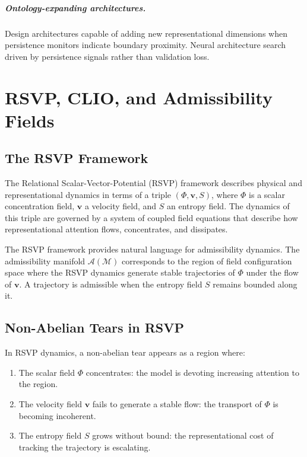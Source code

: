 \documentclass[12pt,oneside]{book}
\theoremstyle{plain}
\theoremstyle{definition}
\theoremstyle{remark}
\newcommand{\M}{\mathcal{M}}
\newcommand{\1}{\mathbf{1}}
\begin{document}
\paragraph{Ontology-expanding architectures.} Design architectures capable of adding new representational dimensions when persistence monitors indicate boundary proximity. Neural architecture search driven by persistence signals rather than validation loss.


\chapter{RSVP, CLIO, and Admissibility Fields}

\section{The RSVP Framework}

The Relational Scalar-Vector-Potential (RSVP) framework describes physical and representational dynamics in terms of a triple $(\Phi, \mathbf{v}, S)$, where $\Phi$ is a scalar concentration field, $\mathbf{v}$ a velocity field, and $S$ an entropy field. The dynamics of this triple are governed by a system of coupled field equations that describe how representational attention flows, concentrates, and dissipates.

The RSVP framework provides natural language for admissibility dynamics. The admissibility manifold $\mathcal{A}(\M)$ corresponds to the region of field configuration space where the RSVP dynamics generate stable trajectories of $\Phi$ under the flow of $\mathbf{v}$. A trajectory is admissible when the entropy field $S$ remains bounded along it.

\section{Non-Abelian Tears in RSVP}

In RSVP dynamics, a non-abelian tear appears as a region where:
\begin{enumerate}[label=(\roman*)]
\item The scalar field $\Phi$ concentrates: the model is devoting increasing attention to the region.
\item The velocity field $\mathbf{v}$ fails to generate a stable flow: the transport of $\Phi$ is becoming incoherent.
\item The entropy field $S$ grows without bound: the representational cost of tracking the trajectory is escalating.
\end{enumerate}
\end{document}

